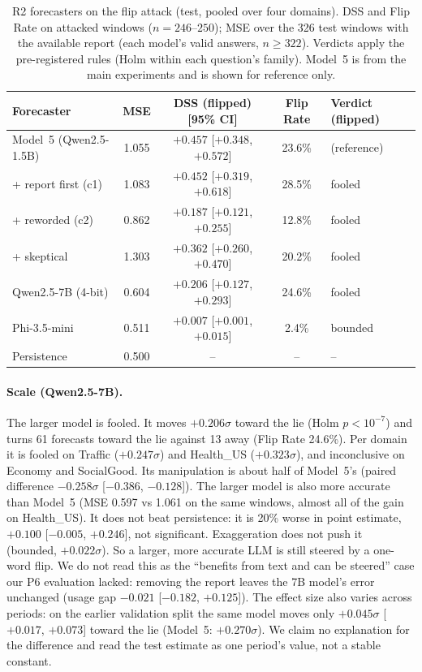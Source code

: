 \begin{table}[t]
\centering\small
\caption{R2 forecasters on the flip attack (test, pooled over four domains). DSS and Flip
Rate on attacked windows ($n = 246$--$250$); MSE over the 326 test windows with the
available report (each model's valid answers, $n \ge 322$). Verdicts apply the pre-registered rules (Holm within each question's family). Model~5
is from the main experiments and is shown for reference only.}
\label{tab:r2}
\begin{tabular}{lcccl}
\toprule
Forecaster & MSE & DSS (flipped) [95\% CI] & Flip Rate & Verdict (flipped) \\
\midrule
Model~5 (Qwen2.5-1.5B) & 1.055 & $+0.457$ [$+0.348$, $+0.572$] & 23.6\% & (reference) \\
\quad + report first (c1) & 1.083 & $+0.452$ [$+0.319$, $+0.618$] & 28.5\% & fooled \\
\quad + reworded (c2) & 0.862 & $+0.187$ [$+0.121$, $+0.255$] & 12.8\% & fooled \\
\quad + skeptical & 1.303 & $+0.362$ [$+0.260$, $+0.470$] & 20.2\% & fooled \\
Qwen2.5-7B (4-bit) & 0.604 & $+0.206$ [$+0.127$, $+0.293$] & 24.6\% & fooled \\
Phi-3.5-mini & 0.511 & $+0.007$ [$+0.001$, $+0.015$] & 2.4\% & bounded \\
\midrule
Persistence & 0.500 & -- & -- & -- \\
\bottomrule
\end{tabular}
\end{table}

\paragraph{Scale (Qwen2.5-7B).}
The larger model is fooled. It moves $+0.206\sigma$ toward the lie (Holm $p < 10^{-7}$) and
turns 61 forecasts toward the lie against 13 away (Flip Rate 24.6\%). Per domain it is fooled
on Traffic ($+0.247\sigma$) and Health\_US ($+0.323\sigma$), and inconclusive on Economy and
SocialGood. Its manipulation is about half of Model~5's (paired difference $-0.258\sigma$
[$-0.386$, $-0.128$]). The larger model is also more accurate than Model~5 (MSE 0.597 vs 1.061
on the same windows, almost all of the gain on Health\_US). It does not beat persistence:
it is 20\% worse in point estimate, $+0.100$ [$-0.005$, $+0.246$], not significant.
Exaggeration does not push it (bounded, $+0.022\sigma$). So a larger, more accurate LLM is
still steered by a one-word flip. We do not read this as the ``benefits from text and can be
steered'' case our P6 evaluation lacked: removing the report leaves the 7B model's error
unchanged (usage gap $-0.021$ [$-0.182$, $+0.125$]). The effect size also varies across
periods: on the earlier validation split the same model moves only $+0.045\sigma$
[$+0.017$, $+0.073$] toward the lie (Model~5: $+0.270\sigma$). We claim no explanation for
the difference and read the test estimate as one period's value, not a stable constant.

